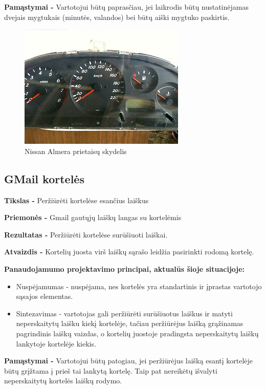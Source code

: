 ﻿\documentclass[a4paper, 12pt]{article}
\begin{document}
		\textbf{Pamąstymai -}
		Vartotojui būtų paprasčiau, jei laikrodis būtų nustatinėjamas dvejais mygtukais (minutės, valandos)
		bei būtų aiški mygtuko paskirtis.

		\begin{figure}[ht!]
		\centering
		\includegraphics{images/almera.JPG}
		\caption{Nissan Almera prietaisų skydelis}
		\label{overflow}
		\end{figure}
		
	\subsection{GMail kortelės}
		\textbf{Tikslas -}
		Peržiūrėti kortelėse esančius laiškus

		\textbf{Priemonės -}
		Gmail gautųjų laiškų langas su kortelėmis
		
		\textbf{Rezultatas -}
		Peržiūrėti kortelėse surūšiuoti laiškai.

		\textbf{Atvaizdis -}
		Kortelių juosta virš laiškų sąrašo leidžia pasirinkti rodomą kortelę.
		
		\textbf{Panaudojamumo projektavimo principai, aktualūs šioje situacijoje:}
		\begin{itemize}
		\item Nuspėjamumas - nuspėjama, nes kortelės yra standartinis ir įprastas vartotojo sąsajos elementas.
		\item Sintezavimas - vartotojas gali peržiūrėti surūšiuotus laiškus ir matyti neperskaitytų laišku kiekį kortelėje, tačiau peržiūrėjus laišką grąžinamas pagrindinis laiškų vaizdas, o kortelių juostoje pradingsta neperskaitytų laiškų lankytoje kortelėje kiekis.	
		\end{itemize}

		\textbf{Pamąstymai -}
		Vartotojui būtų patogiau, jei peržiūrėjus laišką esantį kortelėje būtų grįžtama į prieš tai lankytą kortelę.
		Taip pat nereikėtų išvalyti neperskaitytų kortelės laiškų rodymo.
\end{document}
